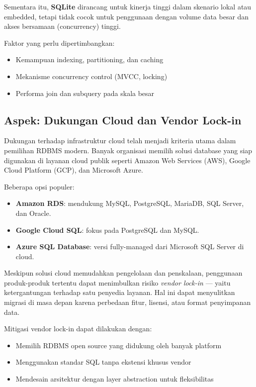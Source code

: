 Sementara itu, \textbf{SQLite} dirancang untuk kinerja tinggi dalam skenario lokal atau embedded, tetapi tidak cocok untuk penggunaan dengan volume data besar dan akses bersamaan (concurrency) tinggi.

Faktor yang perlu dipertimbangkan:
\begin{itemize}
	\item Kemampuan indexing, partitioning, dan caching
	\item Mekanisme concurrency control (MVCC, locking)
	\item Performa join dan subquery pada skala besar
\end{itemize}

\subsection{Aspek: Dukungan Cloud dan Vendor Lock-in}

Dukungan terhadap infrastruktur cloud telah menjadi kriteria utama dalam pemilihan RDBMS modern. Banyak organisasi memilih solusi database yang siap digunakan di layanan cloud publik seperti Amazon Web Services (AWS), Google Cloud Platform (GCP), dan Microsoft Azure.

Beberapa opsi populer:

\begin{itemize}
	\item \textbf{Amazon RDS}: mendukung MySQL, PostgreSQL, MariaDB, SQL Server, dan Oracle.
	\item \textbf{Google Cloud SQL}: fokus pada PostgreSQL dan MySQL.
	\item \textbf{Azure SQL Database}: versi fully-managed dari Microsoft SQL Server di cloud.
\end{itemize}

Meskipun solusi cloud memudahkan pengelolaan dan penskalaan, penggunaan produk-produk tertentu dapat menimbulkan risiko \textit{vendor lock-in} — yaitu ketergantungan terhadap satu penyedia layanan. Hal ini dapat menyulitkan migrasi di masa depan karena perbedaan fitur, lisensi, atau format penyimpanan data.

Mitigasi vendor lock-in dapat dilakukan dengan:
\begin{itemize}
	\item Memilih RDBMS open source yang didukung oleh banyak platform
	\item Menggunakan standar SQL tanpa ekstensi khusus vendor
	\item Mendesain arsitektur dengan layer abstraction untuk fleksibilitas
\end{itemize}

